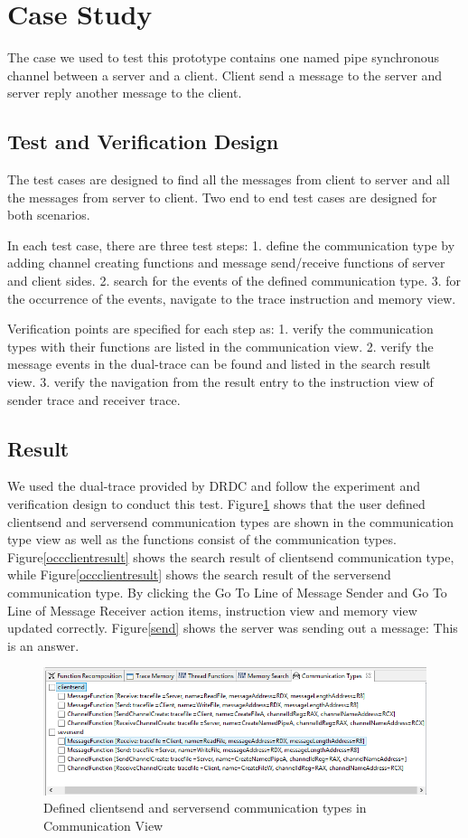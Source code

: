 \documentclass[paper=a4, fontsize=11pt]{scrartcl}
\numberwithin{equation}{section}		%
\numberwithin{figure}{section}			%
\numberwithin{table}{section}				%
\begin{document}
\section{Case Study}
The case we used to test this prototype contains one named pipe synchronous channel between a server and a client. Client send a message to the server and server reply another message to the client. 
\subsection{Test and Verification Design}
The test cases are designed to find all the messages from client to server and all the messages from server to client. Two end to end test cases are designed for both scenarios. 

In each test case, there are three test steps: 1. define the communication type by adding channel creating functions and message send/receive functions of server and client sides. 2. search for the events of  the defined communication type. 3. for the occurrence of the events, navigate to the trace instruction and memory view.

Verification points are specified for each step as: 1. verify the communication types with their functions are listed in the communication view. 2. verify the message events in the dual-trace can be found and listed in the search result view. 3. verify the navigation from the result entry to the instruction view of sender trace and receiver trace.
\subsection{Result}
We used the dual-trace provided by DRDC and follow the experiment and verification design to conduct this test. Figure\ref{addcomtyperesult} shows that the user defined clientsend and serversend communication types are shown in the communication type view as well as the functions consist of the communication types. Figure\ref{occclientresult} shows the search result of clientsend communication type, while Figure\ref{occclientresult} shows the search result of the serversend communication type. By clicking the Go To Line of Message Sender and Go To Line of Message Receiver action items, instruction view and memory view updated correctly. Figure\ref{send} shows the server was sending out a message: This is an answer. 


\begin{figure}[H]
\includegraphics[scale=.72]{addcomtyperesult}
 \caption{Defined clientsend and serversend communication types in Communication View}
\label{addcomtyperesult}
\end{figure}
\end{document}
